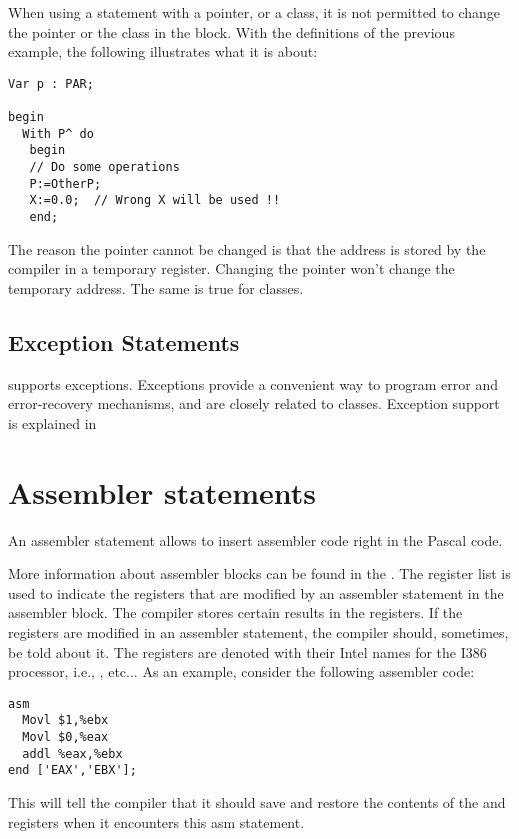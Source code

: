 \begin{remark}
When using a  statement with a pointer, or a class, it is not
permitted to change the pointer or the class in the  block.
With the definitions of the previous example, the following illustrates
what it is about:
\begin{verbatim}
Var p : PAR;

begin
  With P^ do
   begin
   // Do some operations
   P:=OtherP;
   X:=0.0;  // Wrong X will be used !!
   end;
\end{verbatim}
The reason the pointer cannot be changed is that the address is stored
by the compiler in a temporary register. Changing the pointer won't change
the temporary address. The same is true for classes.
\end{remark}

\subsection{Exception Statements}
\fpc supports exceptions. Exceptions provide a convenient way to
program error and error-recovery mechanisms, and are
closely related to classes.
Exception support is explained in 

\section{Assembler statements}
An assembler statement allows to insert assembler code right in the
Pascal code.

More information about assembler blocks can be found in the \progref.
The register list is used to indicate the registers that are modified by an
assembler statement in the assembler block. The compiler stores certain results in the
registers. If  the registers are modified in an assembler statement, the compiler
should, sometimes, be told about it. The registers are denoted with their
Intel names for the I386 processor, i.e., ,  etc...
As an example, consider the following assembler code:
\begin{verbatim}
asm
  Movl $1,%ebx
  Movl $0,%eax
  addl %eax,%ebx
end ['EAX','EBX'];
\end{verbatim}
This will tell the compiler that it should save and restore the contents of
the  and  registers when it encounters this asm statement.

